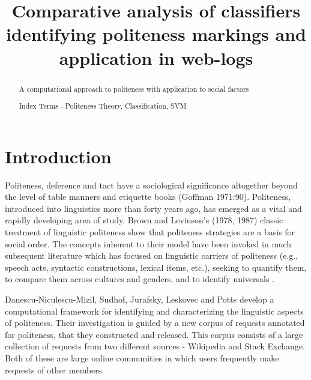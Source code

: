 \documentclass[conference]{IEEEtran}
\begin{document}
%
\title{Comparative analysis of classifiers identifying politeness markings and application in web-logs}


\author{
}




\maketitle
\thispagestyle{plain}
\pagestyle{plain}


\begin{abstract}
A computational approach to politeness with application to social factors

Index Terms - Politeness Theory, Classification, SVM
\end{abstract}
\IEEEpeerreviewmaketitle


\section{Introduction}
Politeness, deference and tact have a sociological significance altogether beyond the level of table manners and etiquette books (Goffman 1971:90). Politeness, introduced into linguistics more than forty years ago, has emerged as a vital and rapidly developing area of study. Brown and Levinson's (1978, 1987) classic treatment of linguistic politeness show that politeness strategies are a basis for social order. The concepts inherent to their model have been invoked in much subsequent literature which has focused on linguistic carriers of politeness (e.g., speech acts, syntactic constructions, lexical items, etc.), seeking to quantify them, to compare them across cultures and genders, and to identify universals \cite{Meier}.

Danescu-Niculescu-Mizil, Sudhof, Jurafsky, Leskovec and Potts \cite{Jurafsky} develop a computational framework for identifying and characterizing the linguistic aspects of politeness. Their investigation is guided by a new corpus of requests annotated for politeness, that they constructed and released. This corpus consists of a large collection of requests from two different sources - Wikipedia and Stack Exchange. Both of these are large online communities in which users frequently make requests of other members. 
\end{document}
